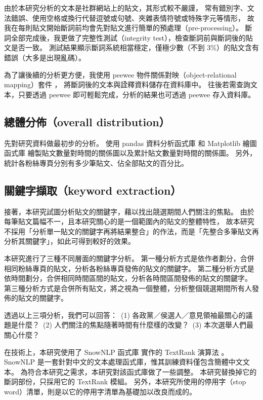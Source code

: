 \documentclass[a4paper, 10pt, conference]{ieeeconf}       %
\begin{document}
\begin{CJK}{UTF8}{bsmi}
由於本研究分析的文本是社群網站上的貼文，其形式較不嚴謹，%
常有錯別字、文法錯誤、使用空格或換行代替逗號或句號、夾雜表情符號或特殊字元等情形，%
故我在每則貼文開始斷詞前均會先對貼文進行簡單的預處理（pre-processing）。%
斷詞全部完成後，我更做了完整性測試（integrity test），檢查斷詞前與斷詞後的貼文是否一致。%
測試結果顯示斷詞系統相當穩定，僅極少數（不到 3\%）的貼文含有錯誤（大多是出現亂碼）。%

為了讓後續的分析更方便，我使用 peewee 物件關係對映（object-relational mapping）套件 \cite{c8}，%
將斷詞後的文本與詮釋資料儲存在資料庫中。%
往後若需查詢文本，只要透過 peewee 即可輕鬆完成，分析的結果也可透過 peewee 存入資料庫。%

\subsection*{總體分佈（overall distribution）}

先對研究資料做最初步的分析。%
使用 pandas 資料分析函式庫 \cite{c9} 和 Matplotlib 繪圖函式庫 \cite{c10} %
繪製貼文數量對時間的關係圖以及累計貼文數量對時間的關係圖。%
另外，統計各粉絲專頁分別有多少筆貼文、佔全部貼文的百分比。%

\subsection*{關鍵字擷取（keyword extraction）}

接著，本研究試圖分析貼文的關鍵字，藉以找出競選期間人們關注的焦點。%
由於每筆貼文篇幅不一，且本研究關心的是一個範圍內的貼文的整體特性，%
故本研究不採用「分析單一貼文的關鍵字再將結果整合」的作法，而是「先整合多筆貼文再分析其關鍵字」，如此可得到較好的效果。%

本研究進行了三種不同層面的關鍵字分析。%
第一種分析方式是依作者劃分，合併相同粉絲專頁的貼文，分析各粉絲專頁發佈的貼文的關鍵字。%
第二種分析方式是依時間劃分，合併相同時間區間的貼文，分析各時間區間發佈的貼文的關鍵字。%
第三種分析方式是合併所有貼文，將之視為一個整體，分析整個競選期間所有人發佈的貼文的關鍵字。%

透過以上三項分析，我們可以回答：%
\,(1) 各政黨／侯選人／意見領袖最關心的議題是什麼？%
\,(2) 人們關注的焦點隨著時間有什麼樣的改變？%
\,(3) 本次選舉人們最關心什麼？%

在技術上，本研究使用了 SnowNLP 函式庫 \cite{c11} 實作的 TextRank 演算法 \cite{c12}。%
SnowNLP 是一套針對中文的文本處理函式庫，惟其訓練資料僅包含簡體中文文本。%
為符合本研究之需求，本研究對該函式庫做了一些調整。%
本研究替換掉它的斷詞部份，只採用它的 TextRank 模組。%
另外，本研究所使用的停用字（stop word）清單，則是以它的停用字清單為基礎加以改良而成的。%


\end{CJK}
\end{document}
